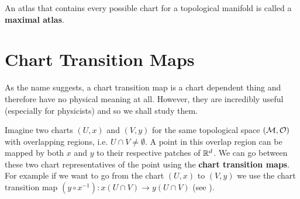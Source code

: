     An atlas that contains every possible chart for a topological manifold is called a \textbf{maximal atlas}.
\ed 

\section{Chart Transition Maps}

As the name suggests, a chart transition map is a chart dependent thing and therefore have no physical meaning at all. However, they are incredibly useful (especially for physicists) and so we shall study them. 

Imagine two charts $(U,x)$ and $(V,y)$ for the same topological space $(\mathcal{M},\mathcal{O})$ with overlapping regions, i.e. $U\cap V \neq \emptyset$. A point in this overlap region can be mapped by both $x$ and $y$ to their respective patches of $\mathbb{R}^d$. We can go between these two chart representatives of the point using the \textbf{chart transition maps}. For example if we want to go from the chart $(U,x)$ to $(V,y)$ we use the chart transition map $(y\circ x^{-1}): x(U\cap V) \to y(U\cap V)$ (see ). 

